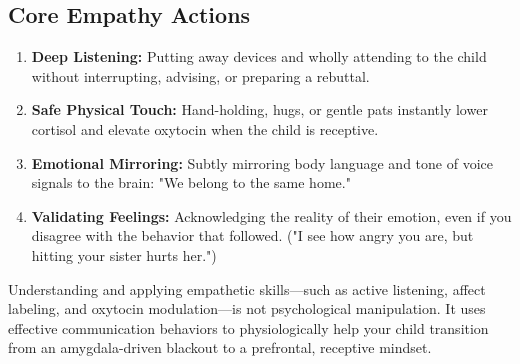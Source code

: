 \subsection{Core Empathy Actions}
\begin{enumerate}
    \item \textbf{Deep Listening:} Putting away devices and wholly attending to the child without interrupting, advising, or preparing a rebuttal.
    \item \textbf{Safe Physical Touch:} Hand-holding, hugs, or gentle pats instantly lower cortisol and elevate oxytocin when the child is receptive.
    \item \textbf{Emotional Mirroring:} Subtly mirroring body language and tone of voice signals to the brain: "We belong to the same home."
    \item \textbf{Validating Feelings:} Acknowledging the reality of their emotion, even if you disagree with the behavior that followed. ("I see how angry you are, but hitting your sister hurts her.")
\end{enumerate}

\begin{keyinsight}
Understanding and applying empathetic skills—such as active listening, affect labeling, and oxytocin modulation—is not psychological manipulation. 
It uses effective communication behaviors to physiologically help your child transition from an amygdala-driven blackout to a prefrontal, receptive mindset.
\end{keyinsight}
\newpage
